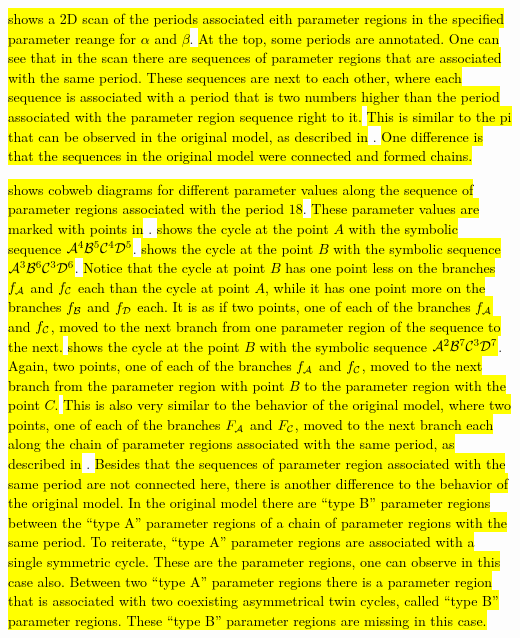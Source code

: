  \hl{shows a 2D scan of the periods associated eith parameter regions in the specified parameter reange for $\alpha$ and $\beta$}.
\hl{
	At the top, some periods are annotated.
	One can see that in the scan there are sequences of parameter regions that are associated with the same period.
	These sequences are next to each other, where each sequence is associated with a period that is two numbers higher than the period associated with the parameter region sequence right to it.
}
\hl{This is similar to the \gls{pi} that can be observed in the original model, as described in} .
\hl{
	One difference is that the sequences in the original model were connected and formed chains.
}

 \hl{shows cobweb diagrams for different parameter values along the sequence of parameter regions associated with the period $18$}.
\hl{These parameter values are marked with points in} .
 \hl{shows the cycle at the point $A$ with the symbolic sequence $\mathcal{A}^4\mathcal{B}^5\mathcal{C}^4\mathcal{D}^5$}.
 \hl{shows the cycle at the point $B$ with the symbolic sequence $\mathcal{A}^3\mathcal{B}^6\mathcal{C}^3\mathcal{D}^6$}.
\hl{
	Notice that the cycle at point $B$ has one point less on the branches $f_{\mathcal{A}}$ and $f_{\mathcal{C}}$ each than the cycle at point $A$, while it has one point more on the branches $f_{\mathcal{B}}$ and $f_{\mathcal{D}}$ each.
	It is as if two points, one of each of the branches $f_{\mathcal{A}}$ and $f_{\mathcal{C}}$, moved to the next branch from one parameter region of the sequence to the next.
}
 \hl{shows the cycle at the point $B$ with the symbolic sequence $\mathcal{A}^2\mathcal{B}^7\mathcal{C}^3\mathcal{D}^7$}.
\hl{
	Again, two points, one of each of the branches $f_{\mathcal{A}}$ and $f_{\mathcal{C}}$, moved to the next branch from the parameter region with point $B$ to the parameter region with the point $C$.
}
\hl{This is also very similar to the behavior of the original model, where two points, one of each of the branches $F_{\mathcal{A}}$ and $F_{\mathcal{C}}$, moved to the next branch each along the chain of parameter regions associated with the same period, as described in} .
\hl{
	Besides that the sequences of parameter region associated with the same period are not connected here, there is another difference to the behavior of the original model.
	In the original model there are ``type B'' parameter regions between the ``type A'' parameter regions of a chain of parameter regions with the same period.
	To reiterate, ``type A'' parameter regions are associated with a single symmetric cycle.
	These are the parameter regions, one can observe in this case also.
	Between two ``type A'' parameter regions there is a parameter region that is associated with two coexisting asymmetrical twin cycles, called ``type B'' parameter regions.
	These ``type B'' parameter regions are missing in this case.
}
